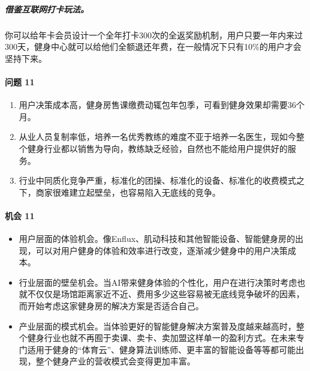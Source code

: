 \documentclass[letterpaper,10pt,english]{sphinxmanual}
\begin{document}
\subparagraph{借鉴互联网打卡玩法。}
\label{\detokenize{chapter_project/AI_fit:id17}}
你可以给年卡会员设计一个全年打卡300次的全返奖励机制，用户只要一年内来过300天，健身中心就可以给他们全额退还年费，在一般情况下只有10\%的用户才会坚持下来。


\paragraph{问题 11\sphinxfootnotemark[783]}
\label{\detokenize{chapter_project/AI_fit:id18}}%
\begin{footnotetext}[783]\sphinxAtStartFootnote
{}
%
\end{footnotetext}\ignorespaces \begin{enumerate}
%
\item {} 
用户决策成本高，健身房售课缴费动辄包年包季，可看到健身效果却需要3\sphinxhyphen{}6个月。

\item {} 
从业人员复制率低，培养一名优秀教练的难度不亚于培养一名医生，现如今整个健身行业都以销售为导向，教练缺乏经验，自然也不能给用户提供好的服务。

\item {} 
行业中同质化竞争严重，标准化的团操、标准化的设备、标准化的收费模式之下，商家很难建立起壁垒，也容易陷入无底线的竞争。

\end{enumerate}


\paragraph{机会 11\sphinxfootnotemark[784]}
\label{\detokenize{chapter_project/AI_fit:id19}}%
\begin{footnotetext}[784]\sphinxAtStartFootnote
{}
%
\end{footnotetext}\ignorespaces \begin{itemize}
\item {} 
用户层面的体验机会。像Enflux、肌动科技和其他智能设备、智能健身房的出现，可以对用户健身的体验和效率进行改变，逐渐减少健身中的用户决策成本。

\item {} 
行业层面的壁垒机会。当AI带来健身体验的个性化，用户在进行决策时考虑也就不仅仅是场馆距离家近不近、费用多少这些容易被无底线竞争破坏的因素，而开始考虑这家健身房的解决方案是否适合自己。

\item {} 
产业层面的模式机会。当体验更好的智能健身解决方案普及度越来越高时，整个健身行业也就不再囿于卖课、卖卡、卖加盟这样单一的盈利方式。在未来专门适用于健身的“体育云”、健身算法训练师、更丰富的智能设备等等都可能出现，整个健身产业的营收模式会变得更加丰富。

\end{itemize}
\end{document}
